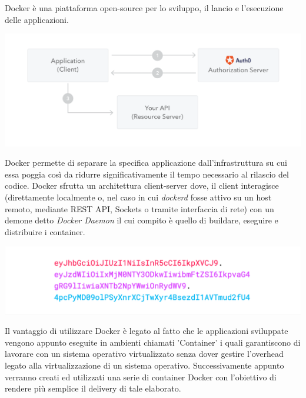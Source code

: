 \documentclass[twoside]{report}
\begin{document}
Docker è una piattaforma open-source per lo sviluppo, il lancio e l'esecuzione delle applicazioni.

\begin{minipage}{\linewidth}
    \vspace{2mm}
    \centering
    \includegraphics[width= \linewidth]{2.png}
    \vspace{2mm}
\end{minipage}

Docker permette di separare la specifica applicazione dall'infrastruttura su cui essa poggia così da ridurre significativamente il tempo necessario al rilascio del codice.
\bigbreak
Docker sfrutta un architettura client-server dove, il client interagisce (direttamente localmente o, nel caso in cui \textit{dockerd} fosse attivo su un host remoto, mediante REST API, Sockets o tramite interfaccia di rete) con un demone detto \textit{Docker Daemon} il cui compito è quello di buildare, eseguire e distribuire i container. 

\begin{minipage}{\linewidth}
    \vspace{2mm}
    \centering
    \includegraphics[width= \linewidth]{1.png}
    \vspace{2mm}
\end{minipage}

Il vantaggio di utilizzare Docker è legato al fatto che le applicazioni sviluppate vengono appunto eseguite in ambienti chiamati 'Container' i quali garantiscono di lavorare con un sistema operativo virtualizzato senza dover gestire l'overhead legato alla virtualizzazione di un sistema operativo.
\bigbreak
Successivamente appunto verranno creati ed utilizzati una serie di container Docker con l'obiettivo di rendere più semplice il delivery di tale elaborato.
\end{document}

